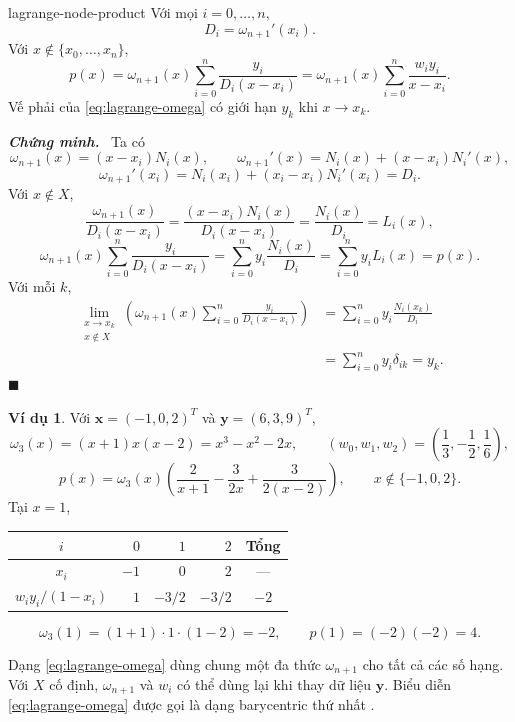 \documentclass[12pt,a4paper,oneside]{book}
\numberwithin{algorithm}{chapter}
\theoremstyle{definition}
\newtheorem{vidu}{Ví dụ}[chapter]
\newenvironment{chungminh}{\par\medskip\noindent\textbf{\textit{\color{mainblue}Chứng minh.}}\ }{\hfill$\blacksquare$\par\medskip}
\begin{document}
\begin{menhde}{}{lagrange-node-product}
Với mọi $i=0,\ldots,n$,
\[
 D_i=\omega_{n+1}'(x_i).
\]
Với $x\notin\{x_0,\ldots,x_n\}$,
\begin{equation}\label{eq:lagrange-omega}
 p(x)=\omega_{n+1}(x)\sum_{i=0}^n\frac{y_i}{D_i(x-x_i)}
     =\omega_{n+1}(x)\sum_{i=0}^n\frac{w_iy_i}{x-x_i}.
\end{equation}
Vế phải của \eqref{eq:lagrange-omega} có giới hạn $y_k$ khi $x\to x_k$.
\end{menhde}
\begin{chungminh}
Ta có
\[
 \omega_{n+1}(x)=(x-x_i)N_i(x),\qquad
 \omega_{n+1}'(x)=N_i(x)+(x-x_i)N_i'(x),
\]
\[
 \omega_{n+1}'(x_i)=N_i(x_i)+(x_i-x_i)N_i'(x_i)=D_i.
\]
Với $x\notin X$,
\[
 \frac{\omega_{n+1}(x)}{D_i(x-x_i)}
 =\frac{(x-x_i)N_i(x)}{D_i(x-x_i)}
 =\frac{N_i(x)}{D_i}=L_i(x),
\]
\[
 \omega_{n+1}(x)\sum_{i=0}^n\frac{y_i}{D_i(x-x_i)}
 =\sum_{i=0}^ny_i\frac{N_i(x)}{D_i}
 =\sum_{i=0}^ny_iL_i(x)=p(x).
\]
Với mỗi $k$,
\begin{align*}
 \lim_{\substack{x\to x_k\\x\notin X}}
 \left(\omega_{n+1}(x)\sum_{i=0}^n\frac{y_i}{D_i(x-x_i)}\right)
 &=\sum_{i=0}^ny_i\frac{N_i(x_k)}{D_i}\\
 &=\sum_{i=0}^ny_i\delta_{ik}=y_k.
\end{align*}
\end{chungminh}

\begin{vidu}
Với $\mathbf x=(-1,0,2)^T$ và $\mathbf y=(6,3,9)^T$,
\[
 \omega_3(x)=(x+1)x(x-2)=x^3-x^2-2x,
 \qquad
 (w_0,w_1,w_2)=\left(\frac13,-\frac12,\frac16\right),
\]
\[
 p(x)=\omega_3(x)\left(\frac2{x+1}-\frac{3}{2x}+\frac{3}{2(x-2)}\right),
 \qquad x\notin\{-1,0,2\}.
\]
Tại $x=1$,
\begin{center}
\begin{tabular}{c|rrr|c}
\toprule
$i$ & $0$ & $1$ & $2$ & Tổng\\
\midrule
$x_i$ & $-1$ & $0$ & $2$ & ---\\
$w_iy_i/(1-x_i)$ & $1$ & $-3/2$ & $-3/2$ & $-2$\\
\bottomrule
\end{tabular}
\end{center}
\[
 \omega_3(1)=(1+1)\cdot1\cdot(1-2)=-2,
 \qquad p(1)=(-2)(-2)=4.
\]
\end{vidu}

Dạng \eqref{eq:lagrange-omega} dùng chung một đa thức $\omega_{n+1}$ cho tất cả các số hạng. Với $X$ cố định, $\omega_{n+1}$ và $w_i$ có thể dùng lại khi thay dữ liệu $\mathbf y$. Biểu diễn \eqref{eq:lagrange-omega} được gọi là dạng barycentric thứ nhất \cite{berrut}.
\end{document}
